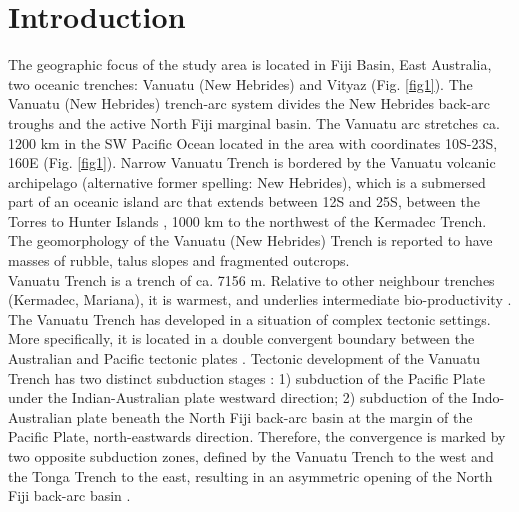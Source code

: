 \documentclass[USenglish]{article}
\begin{document}
  \aop
{}

\maketitle

\section{Introduction}

The geographic focus of the study area is located in Fiji Basin, East Australia, two oceanic trenches: Vanuatu (New Hebrides) and Vityaz (Fig. \ref{fig1}). The Vanuatu (New Hebrides) trench-arc system divides the New Hebrides back-arc troughs and the active North Fiji marginal basin. The Vanuatu arc stretches ca. 1200 km in the SW Pacific Ocean located in the area with coordinates 10\degree S-23\degree S, 160\degree E  (Fig. \ref{fig1}). Narrow Vanuatu Trench is bordered by the Vanuatu volcanic archipelago (alternative former spelling: New Hebrides), which is a submersed part of an oceanic island arc that extends  between 12\degree S and 25\degree S, between the Torres to Hunter Islands \citep{JeanBaptisteetal2016}, 1000 km to the northwest of the Kermadec Trench. The geomorphology of the Vanuatu (New Hebrides) Trench is reported \citep{HeezenHollister} to have masses of rubble, talus slopes and fragmented outcrops. \\
Vanuatu Trench is a trench of ca. 7156 m. Relative to other neighbour trenches (Kermadec, Mariana), it is warmest, and underlies intermediate bio-productivity \citep{Linleyetal2017}. The Vanuatu Trench has developed in a situation of complex tectonic settings. More specifically, it is located in a double convergent boundary between the Australian and Pacific tectonic plates \citep{Beaumais}. Tectonic development of the Vanuatu Trench has two distinct subduction stages \citep{JeanBaptisteetal2016}: 1) subduction of the Pacific Plate under the Indian-Australian plate westward direction; 2) subduction of the Indo-Australian plate beneath the North Fiji back-arc basin at the margin of the Pacific Plate, north-eastwards  direction. Therefore, the convergence is marked by two opposite subduction zones, defined by the Vanuatu Trench to the west and the Tonga Trench to the east, resulting in an asymmetric opening of the North Fiji back-arc basin \citep{Auzende}. 
\end{document}
